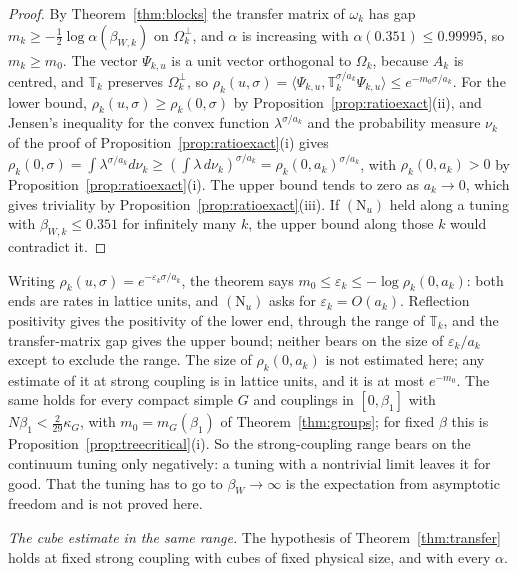 \documentclass[11pt]{amsart}
\theoremstyle{definition}
\theoremstyle{remark}
\numberwithin{equation}{section}
\newcommand{\ip}[2]{\langle #1,#2\rangle}
\begin{document}
\begin{proof}
By Theorem~\ref{thm:blocks} the transfer matrix of $\omega_k$ has gap
$m_k\ge-\frac12\log\alpha(\beta_{W,k})$ on $\Omega_k^\perp$, and $\alpha$ is
increasing with $\alpha(0.351)\le0.99995$, so $m_k\ge m_0$. The vector
$\Psi_{k,u}$ is a unit vector orthogonal to $\Omega_k$, because $A_k$ is
centred, and $\mathbb T_k$ preserves $\Omega_k^\perp$, so
$\rho_k(u,\sigma)=\ip{\Psi_{k,u}}{\mathbb T_k^{\sigma/a_k}\Psi_{k,u}}\le
e^{-m_0\sigma/a_k}$. For the lower bound, $\rho_k(u,\sigma)\ge\rho_k(0,\sigma)$
by Proposition~\ref{prop:ratioexact}(ii), and Jensen's inequality for the
convex function $\lambda^{\sigma/a_k}$ and the probability measure $\nu_k$ of
the proof of Proposition~\ref{prop:ratioexact}(i) gives
$\rho_k(0,\sigma)=\int\lambda^{\sigma/a_k}d\nu_k\ge(\int\lambda\,d\nu_k)^{
\sigma/a_k}=\rho_k(0,a_k)^{\sigma/a_k}$, with $\rho_k(0,a_k)>0$ by
Proposition~\ref{prop:ratioexact}(i). The upper bound tends to zero as
$a_k\to0$, which gives triviality by Proposition~\ref{prop:ratioexact}(iii).
If $(\mathrm N_u)$ held along a tuning with $\beta_{W,k}\le0.351$ for
infinitely many $k$, the upper bound along those $k$ would contradict it.
\end{proof}

Writing $\rho_k(u,\sigma)=e^{-\varepsilon_k\sigma/a_k}$, the theorem says
$m_0\le\varepsilon_k\le-\log\rho_k(0,a_k)$: both ends are rates in lattice
units, and $(\mathrm N_u)$ asks for $\varepsilon_k=O(a_k)$. Reflection
positivity gives the positivity of the lower end, through the range of
$\mathbb T_k$, and the transfer-matrix gap gives the upper bound; neither
bears on the size of $\varepsilon_k/a_k$ except to exclude the range. The size
of $\rho_k(0,a_k)$ is not estimated here; any estimate of it at strong
coupling is in lattice units, and it is at most $e^{-m_0}$. The same holds for
every compact simple $G$ and couplings in $[0,\beta_1]$ with
$N\beta_1<\frac2{29}\kappa_G$, with $m_0=m_G(\beta_1)$ of
Theorem~\ref{thm:groups}; for fixed $\beta$ this is
Proposition~\ref{prop:treecritical}(i). So the strong-coupling range bears on
the continuum tuning only negatively: a tuning with a nontrivial limit leaves
it for good. That the tuning has to go to $\beta_W\to\infty$ is the
expectation from asymptotic freedom and is not proved here.

\emph{The cube estimate in the same range.} The hypothesis of
Theorem~\ref{thm:transfer} holds at fixed strong coupling with cubes of fixed
physical size, and with every $\alpha$.
\end{document}
